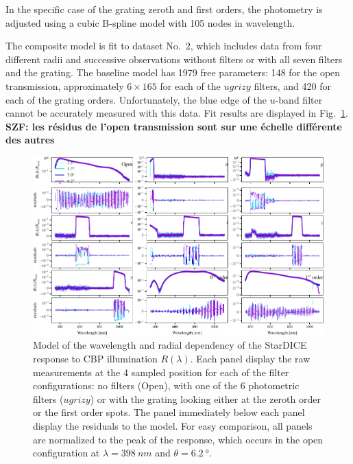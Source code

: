In the specific case of the  grating zeroth and first orders, the photometry is
adjusted using a cubic B-spline model with \num{105} nodes in
wavelength.

The composite model is fit to dataset No.~2, which includes data
from four different radii and successive observations without filters
or with all seven filters and the grating. The baseline model has
\num{1979} free parameters: \num{148} for the open transmission,
approximately $6\times165$ for each of the $ugrizy$ filters, and
\num{420} for each of the grating orders. Unfortunately, the blue edge
of the $u$-band filter cannot be accurately measured with this
data. Fit results are displayed in
Fig.~\ref{fig:lambdathetafitresults}.
\textbf{SZF: les résidus de l'open transmission sont sur une échelle différente des autres}

\begin{figure}
  \centering
  \includegraphics[width=1\linewidth]{./fig/lambdathetafitresults.pdf}
  \caption{Model of the wavelength and radial dependency of the
    StarDICE response to CBP illumination $R(\lambda)$. Each panel
    display the raw measurements at the 4 sampled position for each of
    the filter configurations: no filters (Open), with one of the 6
    photometric filters ($ugrizy$) or with the grating looking either
    at the zeroth order or the first order spots. The panel
    immediately below each panel display the residuals to the
    model. For easy comparison, all panels are normalized to the peak
    of the response, which occurs in the open configuration at
    $\lambda = \SI{398}{nm}$ and $\theta = \SI{6.2}{\degree}$.  }
  \label{fig:lambdathetafitresults}
\end{figure}


